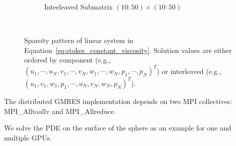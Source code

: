 \begin{figure}
\begin{subfigure}[b]{0.4\textwidth}
		\caption{Interleaved Submatrix $(10:50) \times (10:50)$}
		\label{fig:interleaved_stokes_zoom_dm}
	\end{subfigure} \\
\caption{Sparsity pattern of linear system in Equation~\ref{eq:stokes_constant_viscosity}. Solution values are either ordered by component (e.g., $( u_1, \cdots, u_N, v_1, \cdots, v_N, w_1, \cdots, w_N, p_1, \cdots, p_N)^T$) or interleaved (e.g., $( u_1, v_1, w_1, p_1,\cdots, u_N, v_N, w_N, p_N)^T$). }
\label{fig:interleaved_solution}
\end{figure} 


The distributed GMRES implementation depends on two MPI collectives: MPI\_Alltoallv and MPI\_Allreduce. 



We solve the PDE on the surface of the sphere as an example for one and multiple GPUs. 



